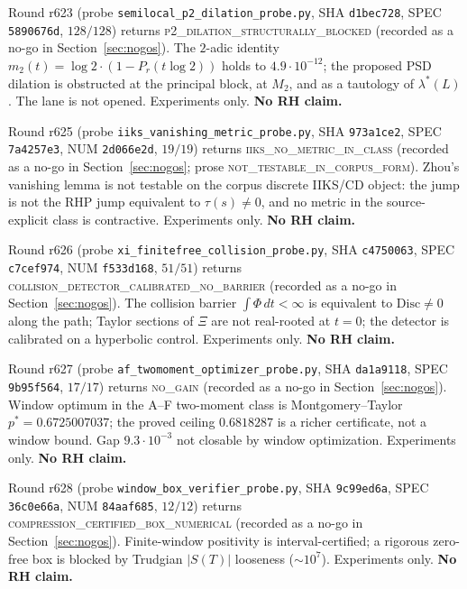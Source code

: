 \documentclass[11pt]{article}
\theoremstyle{definition}
\theoremstyle{remark}
\begin{document}
\noindent Round r623 (probe \texttt{semilocal\_p2\_dilation\_probe.py},
SHA \texttt{d1bec728}, SPEC \texttt{5890676d}, $128/128$) returns
\textsc{p2\_dilation\_structurally\_blocked} (recorded as a no-go
in Section~\ref{sec:nogos}).  The $2$-adic identity
$m_2(t)=\log 2\cdot(1-P_r(t\log 2))$ holds to
$4.9\cdot10^{-12}$; the proposed PSD dilation is obstructed at
the principal block, at $M_2$, and as a tautology of
$\lambda^*(L)$.  The lane is not opened.  Experiments only.
\textbf{No RH claim.}

\noindent Round r625 (probe \texttt{iiks\_vanishing\_metric\_probe.py},
SHA \texttt{973a1ce2}, SPEC \texttt{7a4257e3}, NUM
\texttt{2d066e2d}, $19/19$) returns
\textsc{iiks\_no\_metric\_in\_class} (recorded as a no-go in
Section~\ref{sec:nogos}; prose
\textsc{not\_testable\_in\_corpus\_form}).  Zhou's vanishing
lemma is not testable on the corpus discrete IIKS/CD object:
the jump is not the RHP jump equivalent to $\tau(s)\ne0$, and
no metric in the source-explicit class is contractive.
Experiments only.  \textbf{No RH claim.}

\noindent Round r626 (probe \texttt{xi\_finitefree\_collision\_probe.py},
SHA \texttt{c4750063}, SPEC \texttt{c7cef974}, NUM
\texttt{f533d168}, $51/51$) returns
\textsc{collision\_detector\_calibrated\_no\_barrier}
(recorded as a no-go in Section~\ref{sec:nogos}).  The
collision barrier $\int\Phi\,dt<\infty$ is equivalent to
$\mathrm{Disc}\ne0$ along the path; Taylor sections of $\Xi$
are not real-rooted at $t=0$; the detector is calibrated on a
hyperbolic control.  Experiments only.  \textbf{No RH claim.}

\noindent Round r627 (probe \texttt{af\_twomoment\_optimizer\_probe.py},
SHA \texttt{da1a9118}, SPEC \texttt{9b95f564}, $17/17$) returns
\textsc{no\_gain} (recorded as a no-go in
Section~\ref{sec:nogos}).  Window optimum in the A--F two-moment
class is Montgomery--Taylor $p^*=0.6725007037$; the proved ceiling
$0.6818287$ is a richer certificate, not a window bound.  Gap
$9.3\cdot10^{-3}$ not closable by window optimization.
Experiments only.  \textbf{No RH claim.}

\noindent Round r628 (probe \texttt{window\_box\_verifier\_probe.py},
SHA \texttt{9c99ed6a}, SPEC \texttt{36c0e66a}, NUM
\texttt{84aaf685}, $12/12$) returns
\textsc{compression\_certified\_box\_numerical}
(recorded as a no-go in Section~\ref{sec:nogos}).  Finite-window
positivity is interval-certified; a rigorous zero-free box is
blocked by Trudgian $\lvert S(T)\rvert$ looseness
($\sim 10^{7}$).  Experiments only.  \textbf{No RH claim.}
\end{document}

